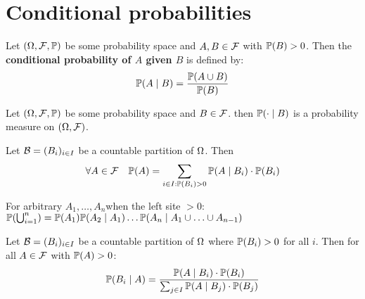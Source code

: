 \section{Conditional probabilities}

\begin{definition*}
  Let \((\O, \F, \P)\) be some probability space and \(A, B \in \F\) with \(\P(B) > 0\). Then the \textbf{conditional probability of \(A\) given \(B\)} is defined by:
  \[\P(A \mid B) = \frac{\P(A \cup B)}{\P(B)}\]
\end{definition*}

\begin{proposition}
  Let \((\O, \F, \P)\) be some probability space and \(B \in \F\). then \(\P(\cdot \mid B)\) is a probability measure on \((\O, \F)\).
\end{proposition}

\begin{theorem*}
  Let \(\B = (B_i)_{i \in I}\) be a countable partition of \(\O\). Then
  \[\forall A \in \F \quad \P(A) = \sum_{i \in I: \P(B_i) > 0} \P(A \mid B_i) \cdot \P(B_i)\]
\end{theorem*}

\begin{lemma}
  For arbitrary \(A_1, \ldots, A_n\)when the left site \(> 0\): \(\P(\bigcup_{i=1}^n) = \P(A_1) \P(A_2 \mid A_1) \ldots \P(A_n \mid A_1 \cup \ldots \cup A_{n-1})\)
\end{lemma}

\begin{theorem*}
  Let \(\B = (B_i)_{i \in I}\) be a countable partition of \(\O\) where \(\P(B_i) > 0\) for all \(i\). Then for all \(A \in \F\) with \(\P(A) > 0\):
  \[\P(B_i \mid A) = \frac{\P(A \mid B_i) \cdot \P(B_i)}{\sum_{j \in I} \P(A \mid B_j) \cdot \P(B_j)}\]
\end{theorem*}


